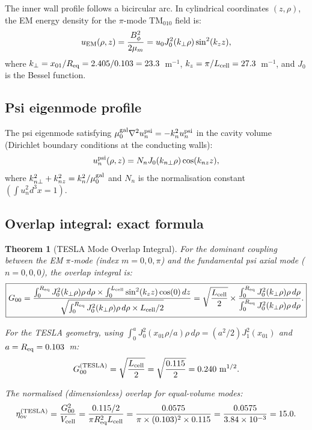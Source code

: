 \documentclass[11pt,twocolumn]{article}
\newcommand{\ee}[1]{\times 10^{#1}}
\newtheorem{theorem}{Theorem}[section]
\begin{document}
The inner wall profile follows a bicircular arc. In cylindrical
coordinates $(z, \rho)$, the EM energy density for the $\pi$-mode
TM$_{010}$ field is:
\begin{equation}
u_{\rm EM}(\rho, z) = \frac{B_\phi^2}{2\mu_m}
= u_0 J_0^2(k_\perp \rho)\sin^2(k_z z),
\label{eq:uEM_tesla}
\end{equation}
where $k_\perp = x_{01}/R_{\rm eq} = 2.405/0.103 = 23.3$~m$^{-1}$,
$k_z = \pi/L_{\rm cell} = 27.3$~m$^{-1}$, and $J_0$ is the Bessel function.

\subsection{Psi eigenmode profile}

The psi eigenmode satisfying $\mu_0^{\rm gal}\nabla^2 u_n^{\rm psi} = -k_n^2 u_n^{\rm psi}$
in the cavity volume (Dirichlet boundary conditions at the conducting walls):
\begin{equation}
u_n^{\rm psi}(\rho, z) = N_n J_0(k_{n\perp} \rho)\cos(k_{nz} z),
\label{eq:upsi_tesla}
\end{equation}
where $k_{n\perp}^2 + k_{nz}^2 = k_n^2/\mu_0^{\rm gal}$ and $N_n$ is
the normalisation constant $\left(\int u_n^2 d^3x = 1\right)$.

\subsection{Overlap integral: exact formula}

\begin{theorem}[TESLA Mode Overlap Integral]
\label{thm:tesla_overlap}
For the dominant coupling between the EM $\pi$-mode (index $m = 0,0,\pi$)
and the fundamental psi axial mode ($n = 0,0,0$), the overlap integral is:
\begin{equation}
\boxed{
G_{00} = \frac{\int_0^{R_{\rm eq}} J_0^2(k_\perp\rho)\rho\,d\rho
\times \int_0^{L_{\rm cell}} \sin^2(k_z z)\cos(0)\,dz}
{\sqrt{
\int_0^{R_{\rm eq}} J_0^2(k_\perp\rho)\rho\,d\rho
\times L_{\rm cell}/2}}
= \sqrt{\frac{L_{\rm cell}}{2}}
\times\frac{\int_0^{R_{\rm eq}} J_0^2(k_\perp\rho)\rho\,d\rho}
{\int_0^{R_{\rm eq}} J_0^2(k_\perp\rho)\rho\,d\rho}.
}
\label{eq:G00_exact}
\end{equation}

For the TESLA geometry, using $\int_0^a J_0^2(x_{01}\rho/a)\rho\,d\rho
= (a^2/2)J_1^2(x_{01})$ and $a = R_{\rm eq} = 0.103$~m:
\begin{equation}
G_{00}^{\rm (TESLA)} = \sqrt{\frac{L_{\rm cell}}{2}}
= \sqrt{\frac{0.115}{2}} = 0.240~\text{m}^{1/2}.
\label{eq:G00_tesla_value}
\end{equation}

The \emph{normalised} (dimensionless) overlap for equal-volume modes:
\begin{equation}
\eta_{\rm ov}^{\rm (TESLA)} = \frac{G_{00}^2}{V_{\rm cell}}
= \frac{0.115/2}{\pi R_{\rm eq}^2 L_{\rm cell}}
= \frac{0.0575}{\pi\times(0.103)^2\times0.115}
= \frac{0.0575}{3.84\ee{-3}}
= 15.0.
\label{eq:eta_tesla}
\end{equation}
\end{theorem}
\end{document}

